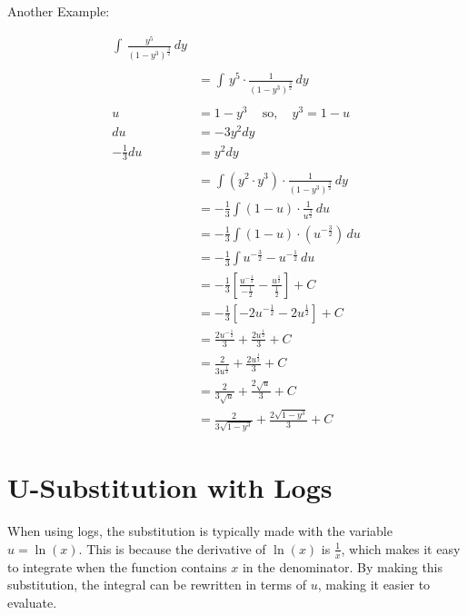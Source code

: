 \noindent Another Example:

\begin{framed}
\begin{align*}
  \int  \, \frac{y^5}{(1-y^3)^{\frac{3}{2}}} \, dy\\\\
  &= \int \, y^5 \cdot \frac{1}{(1-y^3)^{\frac{3}{2}}} \, dy\\\\
  u &= 1-y^3 \; \; \; \text{  so, }  \; \; \; y^3 = 1-u\\
  du &= -3y^2dy\\
  -\frac{1}{3}du &= y^2dy\\\\
  &= \int \left(y^2 \cdot y^3\right) \cdot \frac{1}{(1-y^3)^{\frac{3}{2}}} \, dy\\
  &= -\frac{1}{3} \int (1-u) \cdot \frac{1}{u^{\frac{3}{2}}} \, du\\
  &= -\frac{1}{3} \int (1-u) \cdot \left(u^{-\frac{3}{2}}\right) \, du\\
  &= -\frac{1}{3} \int u^{-\frac{3}{2}} - u^{-\frac{1}{2}} \, du\\
  &= -\frac{1}{3} \left[\frac{u^{-\frac{1}{2}}}{-\frac{1}{2}} 
  - \frac{u^{\frac{1}{2}}}{\frac{1}{2}}\right] + C\\
  &= -\frac{1}{3} \left[-2u^{-\frac{1}{2}} - 2u^{\frac{1}{2}}\right] + C\\
  &= \frac{2u^{-\frac{1}{2}}}{3} + \frac{2u^{\frac{1}{2}}}{3} + C\\
  &= \frac{2}{3u^{\frac{1}{2}}} + \frac{2u^{\frac{1}{2}}}{3} + C\\
  &= \frac{2}{3\sqrt{u}} + \frac{2\sqrt{u}}{3} + C\\
  &= \frac{2}{3\sqrt{1-y^3}} + \frac{2\sqrt{1-y^3}}{3} + C
\end{align*}
\end{framed}

\newpage

\section{U-Substitution with Logs}
\noindent When using logs, the substitution is typically made with the variable 
$u = \ln(x)$. This is because the derivative of $\ln(x)$ is $\frac{1}{x}$, which 
makes it easy to integrate when the function contains $x$ in the denominator. 
By making this substitution, the integral can be rewritten in terms of $u$, 
making it easier to evaluate.\\

